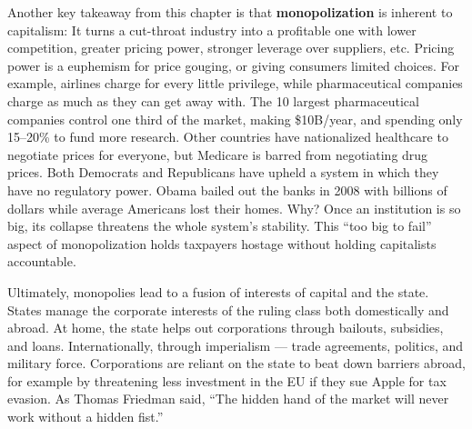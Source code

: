 Another key takeaway from this chapter is that \textbf{monopolization} is inherent to capitalism: It turns a cut-throat industry into a profitable one with lower competition, greater pricing power, stronger leverage over suppliers, etc. Pricing power is a euphemism for price gouging, or giving consumers limited choices. For example, airlines charge for every little privilege, while pharmaceutical companies charge as much as they can get away with. The 10 largest pharmaceutical companies control one third of the market, making \$10B/year, and spending only 15–20\% to fund more research. Other countries have nationalized healthcare to negotiate prices for everyone, but Medicare is barred from negotiating drug prices. Both Democrats and Republicans have upheld a system in which they have no regulatory power. Obama bailed out the banks in 2008 with billions of dollars while average Americans lost their homes. Why? Once an institution is so big, its collapse threatens the whole system’s stability. This “too big to fail” aspect of monopolization holds taxpayers hostage without holding capitalists accountable.

Ultimately, monopolies lead to a fusion of interests of capital and the state. States manage the corporate interests of the ruling class both domestically and abroad. At home, the state helps out corporations through bailouts, subsidies, and loans. Internationally, through imperialism — trade agreements, politics, and military force. Corporations are reliant on the state to beat down barriers abroad, for example by threatening less investment in the EU if they sue Apple for tax evasion. As Thomas Friedman said, “The hidden hand of the market will never work without a hidden fist.”

